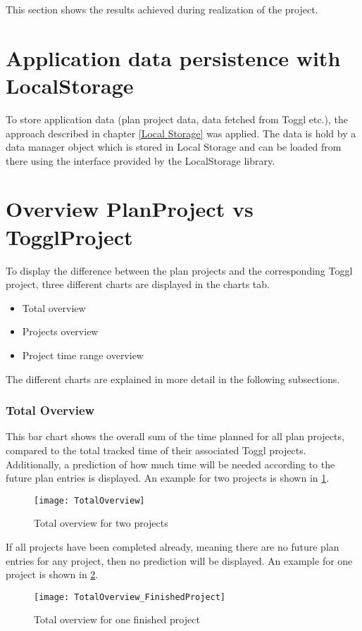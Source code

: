 
This section shows the results achieved during realization of the project.

\section{Application data persistence with LocalStorage}
To store application data (plan project data, data fetched from Toggl etc.), the approach described in chapter \ref{Local Storage} was applied. The data is hold by a data manager object which is stored in Local Storage and can be loaded from there using the interface provided by the LocalStorage library.

\section{Overview PlanProject vs TogglProject} \label{Graphical overview}
To display the difference between the plan projects and the corresponding Toggl project, three different charts are displayed in the charts tab.
\begin{itemize}
	\item Total overview
	\item Projects overview
	\item Project time range overview
\end{itemize}
The different charts are explained in more detail in the following subsections.

\subsubsection{Total Overview}
This bar chart shows the overall sum of the time planned for all plan projects, compared to the total tracked time of their associated Toggl projects. Additionally, a prediction of how much time will be needed according to the future plan entries is displayed. An example for two projects is shown in \ref{figure9}.
\begin{figure}[H]
	\centering
	\texttt{[image: TotalOverview]}
	\caption{Total overview for two projects}
	\label{figure9}
\end{figure}
If all projects have been completed already, meaning there are no future plan entries for any project, then no prediction will be displayed. An example for one project is shown in \ref{figure10}.
\begin{figure}[H]
	\centering
	\texttt{[image: TotalOverview\_FinishedProject]}
	\caption{Total overview for one finished project}
	\label{figure10}
\end{figure}

